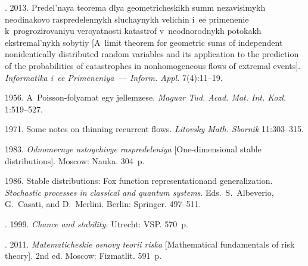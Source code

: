   \begin{multicols}{2}

\renewcommand{\bibname}{\protect\rmfamily References}

{\small\frenchspacing
 {%
 \begin{thebibliography}{99}

    . 2013.
    Predel'naya teorema dlya geometricheskikh summ ne\-za\-vi\-si\-mykh neodinakovo
    raspredelennykh sluchaynykh velichin i~ee primenenie k~progrozirovaniyu
    veroyatnosti ka\-tast\-rof v~neodnorodnykh potokakh ekstremal'nykh sobytiy
    [A~limit theorem for geometric sums of independent nonidentically
    distributed random variables and its application to the prediction of the probabilities of
    catastrophes in
    nonhomogeneous flows of extremal events].
    \textit{Informatika i~ee Primeneniya~--- Inform. Appl.} 7(4):11--19.
    
     1956.
    A~Poisson-folyamat egy jellemzese. \textit{Maguar Tud. Acad. Mat. Int. Kozl.} 1:519--527.
    
     1971.
    Some notes on thinning recurrent flows. \textit{Litovsky Math. Sbornik} 11:303--315.
    
     1983.
    \textit{Odnomernye ustoychivye raspredeleniya} 
    [One-dimensional stable distributions]. Moscow: Nauka. 304~p.
    
    
     1986.
    Stable distributions: Fox function representationand generalization. 
    \textit{Stochastic processes in classical and quantum systems}. 
    Eds.\ S.~Albeverio, G.~Casati, and D.~Merlini. Berlin: Springer. 497--511.
    
    . 1999.
    \textit{Chance and stability.} Utrecht: VSP. 570~p.
    
. 2011.
    \textit{Matematicheskie osnovy teorii riska} 
    [Mathematical fundamentals of risk theory]. 2nd ed. Moscow: Fizmatlit. 591~p.
    

\end{thebibliography}}}
\end{multicols}
